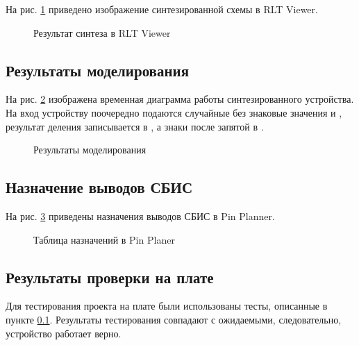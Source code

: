 На рис. \ref{fig:elab3_1_rtl} приведено изображение синтезированной схемы в RLT Viewer.

\begin{figure}[H]
\begin{center}
	\caption{Результат синтеза в RLT Viewer}
	\label{fig:elab3_1_rtl}
\end{center}
\end{figure}

\subsection{Результаты моделирования}
\label{sec:elab3_1_modeling}

На рис. \ref{fig:elab3_1_modeling} изображена временная диаграмма работы синтезированного устройства. На вход устройству поочередно подаются случайные без знаковые значения  и , результат деления записывается в , а знаки после запятой в .
\begin{figure}[H]
\begin{center}
	\caption{Результаты моделирования}
	\label{fig:elab3_1_modeling}
\end{center}
\end{figure}

\subsection{Назначение выводов СБИС}

На рис. \ref{fig:elab3_1_pins} приведены назначения выводов СБИС в Pin Planner.

\begin{figure}[H]
\begin{center}
	\caption{Таблица назначений в Pin Planer}
	\label{fig:elab3_1_pins}
\end{center}
\end{figure}

\subsection{Результаты проверки на плате}

Для тестирования проекта на плате были использованы тесты, описанные в пункте \ref{sec:elab3_1_modeling}. Результаты тестирования совпадают с ожидаемыми, следовательно, устройство работает верно.

